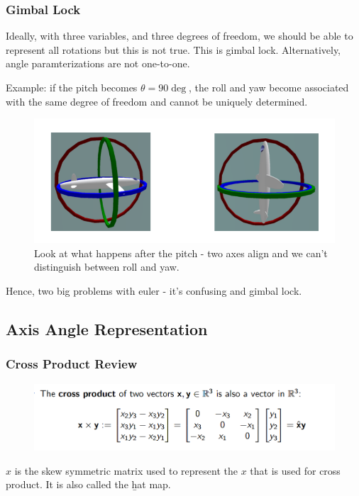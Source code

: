 \subsubsection{Gimbal Lock}

Ideally, with three variables, and three degrees of freedom, we should be able to represent all rotations but this is not true. This is gimbal lock. Alternatively, angle paramterizations are not one-to-one.

Example: if the pitch becomes $\theta = 90\deg$, the roll and yaw become associated with the same degree of freedom and cannot be uniquely determined.

\begin{figure}[h]\centering\includegraphics[width=12cm]{img/j_3_9.png}\caption{Look at what happens after the pitch - two axes align and we can't distinguish between roll and yaw.}\end{figure}

Hence, two big problems with euler - it's confusing and gimbal lock.

\subsection{Axis Angle Representation}

\subsubsection*{Cross Product Review}

\begin{figure}[h]\centering\includegraphics[width=12cm]{img/j_3_10.png}\end{figure}

$\hat{x}$ is the skew symmetric matrix used to represent the $x$ that is used for cross product. It is also called the \b{hat map}.


